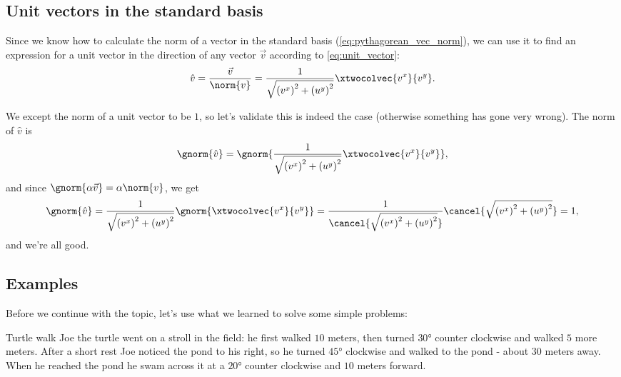 
\subsection{Unit vectors in the standard basis}
Since we know how to calculate the norm of a vector in the standard basis (\autoref{eq:pythagorean_vec_norm}), we can use it to find an expression for a unit vector in the direction of any vector $\vec{v}$ according to \autoref{eq:unit_vector}:
\[
  \hat{v} = \frac{\vec{v}}{\norm{v}} = \frac{1}{\sqrt{\left(v^{x}\right)^{2}+\left(u^{y}\right)^{2}}}\xtwocolvec{v^{x}}{v^{y}}.
\]

We except the norm of a unit vector to be $1$, so let's validate this is indeed the case (otherwise something has gone very wrong). The norm of $\hat{v}$ is
\[
  \gnorm{\hat{v}} = \gnorm{\frac{1}{\sqrt{\left(v^{x}\right)^{2}+\left(u^{y}\right)^{2}}}\xtwocolvec{v^{x}}{v^{y}}},
\]
and since $\gnorm{\alpha\vec{v}} = \alpha\norm{v}$, we get
\[
  \gnorm{\hat{v}} = \frac{1}{\sqrt{\left(v^{x}\right)^{2}+\left(u^{y}\right)^{2}}}\gnorm{\xtwocolvec{v^{x}}{v^{y}}} = \frac{1}{\cancel{\sqrt{\left(v^{x}\right)^{2}+\left(u^{y}\right)^{2}}}}\cancel{\sqrt{\left(v^{x}\right)^{2}+\left(u^{y}\right)^{2}}} = 1,
\]
and we're all good.

\subsection{Examples}
Before we continue with the topic, let's use what we learned to solve some simple problems:

\begin{example}{Turtle walk}{}
  Joe the turtle went on a stroll in the field: he first walked $10$ meters, then turned $\ang{30}$ counter clockwise and walked $5$ more meters. After a short rest Joe noticed the pond to his right, so he turned $\ang{45}$ clockwise and walked to the pond - about $30$ meters away. When he reached the pond he swam across it at a $\ang{20}$ counter clockwise and $10$ meters forward.
\end{example}


